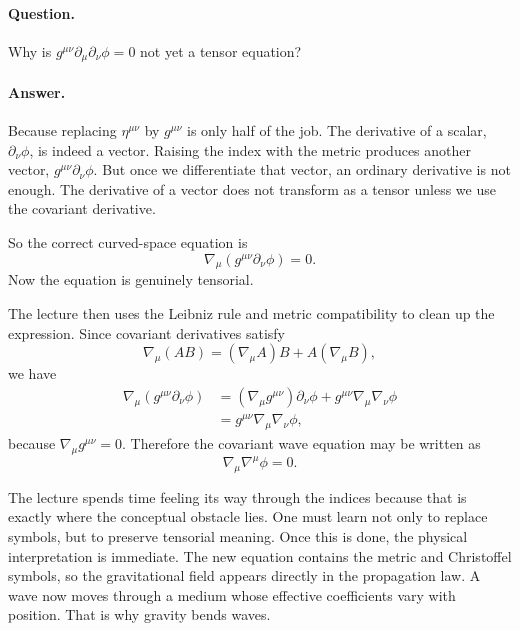 \paragraph{Question.} Why is \(g^{\mu\nu}\partial_\mu\partial_\nu\phi=0\) not yet a tensor equation?

\paragraph{Answer.} Because replacing \(\eta^{\mu\nu}\) by \(g^{\mu\nu}\) is only half of the job. The derivative of a scalar, \(\partial_\nu\phi\), is indeed a vector. Raising the index with the metric produces another vector, \(g^{\mu\nu}\partial_\nu\phi\). But once we differentiate that vector, an ordinary derivative is not enough. The derivative of a vector does not transform as a tensor unless we use the covariant derivative.

So the correct curved-space equation is
\begin{equation}
\nabla_\mu\!\left(g^{\mu\nu}\partial_\nu\phi\right)=0.
\end{equation}
Now the equation is genuinely tensorial.

The lecture then uses the Leibniz rule and metric compatibility to clean up the expression. Since covariant derivatives satisfy
\begin{equation}
\nabla_\mu(AB)=(\nabla_\mu A)B+A(\nabla_\mu B),
\end{equation}
we have
\begin{align}
\nabla_\mu\!\left(g^{\mu\nu}\partial_\nu\phi\right)
&=
(\nabla_\mu g^{\mu\nu})\partial_\nu\phi
+
g^{\mu\nu}\nabla_\mu\nabla_\nu\phi \\
&=
g^{\mu\nu}\nabla_\mu\nabla_\nu\phi,
\end{align}
because \(\nabla_\mu g^{\mu\nu}=0\). Therefore the covariant wave equation may be written as
\begin{equation}
\nabla_\mu\nabla^\mu\phi=0.
\end{equation}

The lecture spends time feeling its way through the indices because that is exactly where the conceptual obstacle lies. One must learn not only to replace symbols, but to preserve tensorial meaning. Once this is done, the physical interpretation is immediate. The new equation contains the metric and Christoffel symbols, so the gravitational field appears directly in the propagation law. A wave now moves through a medium whose effective coefficients vary with position. That is why gravity bends waves.


